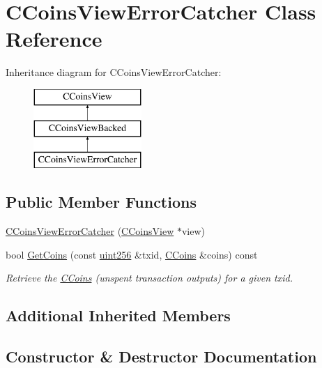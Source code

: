 \hypertarget{class_c_coins_view_error_catcher}{}\section{C\+Coins\+View\+Error\+Catcher Class Reference}
\label{class_c_coins_view_error_catcher}
Inheritance diagram for C\+Coins\+View\+Error\+Catcher\+:\begin{figure}[H]
\begin{center}
\leavevmode
\includegraphics[height=3.000000cm]{class_c_coins_view_error_catcher}
\end{center}
\end{figure}
\subsection*{Public Member Functions}
\begin{DoxyCompactItemize}
\item 
\hyperlink{class_c_coins_view_error_catcher_aa8295e2f5ce5ad9880c5bd86d52e014c}{C\+Coins\+View\+Error\+Catcher} (\hyperlink{class_c_coins_view}{C\+Coins\+View} $\ast$view)
\item 
bool \hyperlink{class_c_coins_view_error_catcher_a762969de31b62e55d01f1cdf0b178eb9}{Get\+Coins} (const \hyperlink{classuint256}{uint256} \&txid, \hyperlink{class_c_coins}{C\+Coins} \&coins) const 
\begin{DoxyCompactList}\small\item\em Retrieve the \hyperlink{class_c_coins}{C\+Coins} (unspent transaction outputs) for a given txid. \end{DoxyCompactList}\end{DoxyCompactItemize}
\subsection*{Additional Inherited Members}


\subsection{Constructor \& Destructor Documentation}
\hypertarget{class_c_coins_view_error_catcher_aa8295e2f5ce5ad9880c5bd86d52e014c}{}
